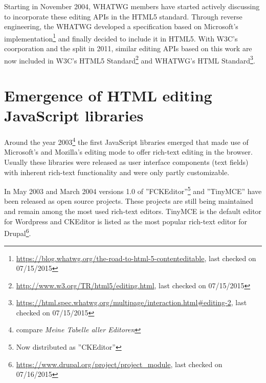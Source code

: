 
Starting in November 2004, WHATWG members have started actively discussing to incorporate these editing APIs in the HTML5 standard. Through reverse engineering, the WHATWG developed a specification based on Microsoft's implementation\footnote{\url{https://blog.whatwg.org/the-road-to-html-5-contenteditable}, last checked on 07/15/2015} and finally decided to include it in HTML5. With W3C's coorporation and the split in 2011, similar editing APIs based on this work are now included in W3C's HTML5 Standard\footnote{\url{http://www.w3.org/TR/html5/editing.html}, last checked on 07/15/2015} and WHATWG's HTML Standard\footnote{\url{https://html.spec.whatwg.org/multipage/interaction.html#editing-2}, last checked on 07/15/2015}.

\section{Emergence of HTML editing JavaScript libraries}

Around the year 2003\footnote{compare \textit{Meine Tabelle aller Editoren}} the first JavaScript libraries emerged that made use of Microsoft's and Mozilla's editing mode to offer rich-text editing in the browser. Usually these libraries were released as user interface components (text fields) with inherent rich-text functionality and were only partly customizable.

In May 2003 and March 2004 versions 1.0 of ''FCKEditor''\footnote{Now distributed as ''CKEditor''} and ''TinyMCE'' have been released as open source projects. These projects are still being maintained and remain among the most used rich-text editors. TinyMCE is the default editor for Wordpress and CKEditor is listed as the most popular rich-text editor for Drupal\footnote{\url{https://www.drupal.org/project/project\_module}, last checked on 07/16/2015}. 

